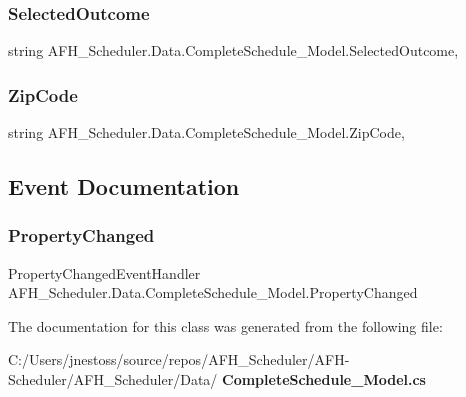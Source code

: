 \subsubsection{SelectedOutcome}
{\footnotesize\ttfamily string A\+F\+H\+\_\+\+Scheduler.\+Data.\+Complete\+Schedule\+\_\+\+Model.\+Selected\+Outcome\hspace{0.3cm}{\ttfamily [get]}, {\ttfamily [set]}}

\mbox{\label{class_a_f_h___scheduler_1_1_data_1_1_complete_schedule___model_a2baeaa34219ec6d176a5872240b7189f}} 
\subsubsection{ZipCode}
{\footnotesize\ttfamily string A\+F\+H\+\_\+\+Scheduler.\+Data.\+Complete\+Schedule\+\_\+\+Model.\+Zip\+Code\hspace{0.3cm}{\ttfamily [get]}, {\ttfamily [set]}}



\subsection{Event Documentation}
\mbox{\label{class_a_f_h___scheduler_1_1_data_1_1_complete_schedule___model_a8a46a8cfbc6f65f5094a7ee0e10a3c72}} 
\subsubsection{PropertyChanged}
{\footnotesize\ttfamily Property\+Changed\+Event\+Handler A\+F\+H\+\_\+\+Scheduler.\+Data.\+Complete\+Schedule\+\_\+\+Model.\+Property\+Changed}



The documentation for this class was generated from the following file\+:\begin{DoxyCompactItemize}
\item 
C\+:/\+Users/jnestoss/source/repos/\+A\+F\+H\+\_\+\+Scheduler/\+A\+F\+H-\/\+Scheduler/\+A\+F\+H\+\_\+\+Scheduler/\+Data/\textbf{ Complete\+Schedule\+\_\+\+Model.\+cs}\end{DoxyCompactItemize}

